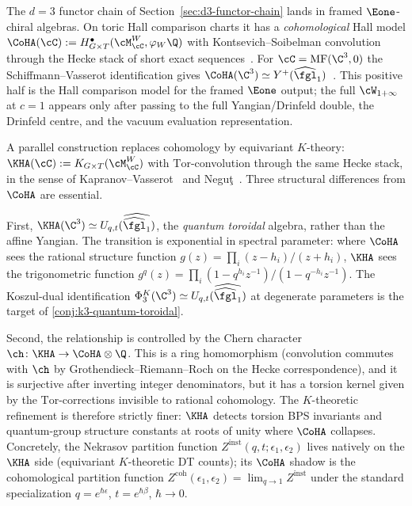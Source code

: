 \begin{remark}
\label{rem:kha-vs-coha-bridge}
The $d = 3$ functor chain of Section~\ref{sec:d3-functor-chain} lands in framed $\Eone$-chiral algebras. On toric Hall comparison charts it has a \emph{cohomological} Hall model
$\CoHA(\cC) := H^\bullet_{G \times T}(\cM^W_\cC, \varphi_W \Q)$ with Kontsevich--Soibelman convolution through the Hecke stack of short exact sequences~\cite{KS2008}. For $\cC = \mathrm{MF}(\C^3, 0)$ the Schiffmann--Vasserot identification gives $\CoHA(\C^3) \simeq Y^+(\widehat{\fgl}_1)$~\cite{SV2013}. This positive half is the Hall comparison model for the framed $\Eone$ output; the full $\cW_{1 + \infty}$ at $c = 1$ appears only after passing to the full Yangian/Drinfeld double, the Drinfeld centre, and the vacuum evaluation representation.

A parallel construction replaces cohomology by equivariant $K$-theory: $\KHA(\cC) := K_{G \times T}(\cM^W_\cC)$ with $\mathrm{Tor}$-convolution through the same Hecke stack, in the sense of Kapranov--Vasserot~\cite{KV2011} and Negu\c{t}~\cite{Negut2022}. Three structural differences from $\CoHA$ are essential.

First, $\KHA(\C^3) \simeq U_{q,t}(\widehat{\widehat{\fgl}_1})$, the \emph{quantum toroidal} algebra, rather than the affine Yangian. The transition is exponential in spectral parameter: where $\CoHA$ sees the rational structure function $g(z) = \prod_i (z - h_i)/(z + h_i)$, $\KHA$ sees the trigonometric function $g^q(z) = \prod_i (1 - q^{h_i} z^{-1})/(1 - q^{-h_i} z^{-1})$. The Koszul-dual identification $\Phi_3^K(\C^3) \simeq U_{q,t}(\widehat{\widehat{\fgl}_1})$ at degenerate parameters is the target of \ref{conj:k3-quantum-toroidal}.

Second, the relationship is controlled by the Chern character $\ch \colon \KHA \to \CoHA \otimes \Q$. This is a ring homomorphism (convolution commutes with $\ch$ by Grothendieck--Riemann--Roch on the Hecke correspondence), and it is surjective after inverting integer denominators, but it has a torsion kernel given by the $\mathrm{Tor}$-corrections invisible to rational cohomology. The $K$-theoretic refinement is therefore strictly finer: $\KHA$ detects torsion BPS invariants and quantum-group structure constants at roots of unity where $\CoHA$ collapses. Concretely, the Nekrasov partition function $Z^{\mathrm{inst}}(q, t; \epsilon_1, \epsilon_2)$ lives natively on the $\KHA$ side (equivariant $K$-theoretic DT counts); its $\CoHA$ shadow is the cohomological partition function $Z^{\mathrm{coh}}(\epsilon_1, \epsilon_2) = \lim_{q \to 1} Z^{\mathrm{inst}}$ under the standard specialization $q = e^{\hbar \epsilon}$, $t = e^{\hbar \beta}$, $\hbar \to 0$.


\end{remark}
